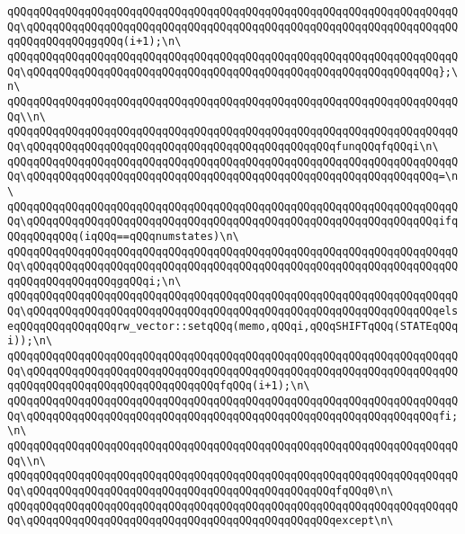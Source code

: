 \verb|qQQqqQQqqQQqqQQqqQQqqQQqqQQqqQQqqQQqqQQqqQQqqQQqqQQqqQQqqQQqqQQqqQQqqQQq\qQQqqQQqqQQqqQQqqQQqqQQqqQQqqQQqqQQqqQQqqQQqqQQqqQQqqQQqqQQqqQQqqQQqqQQqqQQqqQQqgqQQq(i+1);\n\|\newline
\verb|qQQqqQQqqQQqqQQqqQQqqQQqqQQqqQQqqQQqqQQqqQQqqQQqqQQqqQQqqQQqqQQqqQQqqQQq\qQQqqQQqqQQqqQQqqQQqqQQqqQQqqQQqqQQqqQQqqQQqqQQqqQQqqQQqqQQqqQQq};\n\|\newline
\verb|qQQqqQQqqQQqqQQqqQQqqQQqqQQqqQQqqQQqqQQqqQQqqQQqqQQqqQQqqQQqqQQqqQQqqQQq\\n\|\newline
\verb|qQQqqQQqqQQqqQQqqQQqqQQqqQQqqQQqqQQqqQQqqQQqqQQqqQQqqQQqqQQqqQQqqQQqqQQq\qQQqqQQqqQQqqQQqqQQqqQQqqQQqqQQqqQQqqQQqqQQqqQQqfunqQQqfqQQqi\n\|\newline
\verb|qQQqqQQqqQQqqQQqqQQqqQQqqQQqqQQqqQQqqQQqqQQqqQQqqQQqqQQqqQQqqQQqqQQqqQQq\qQQqqQQqqQQqqQQqqQQqqQQqqQQqqQQqqQQqqQQqqQQqqQQqqQQqqQQqqQQqqQQq=\n\|\newline
\verb|qQQqqQQqqQQqqQQqqQQqqQQqqQQqqQQqqQQqqQQqqQQqqQQqqQQqqQQqqQQqqQQqqQQqqQQq\qQQqqQQqqQQqqQQqqQQqqQQqqQQqqQQqqQQqqQQqqQQqqQQqqQQqqQQqqQQqqQQqifqQQqqQQqqQQq(iqQQq==qQQqnumstates)\n\|\newline
\verb|qQQqqQQqqQQqqQQqqQQqqQQqqQQqqQQqqQQqqQQqqQQqqQQqqQQqqQQqqQQqqQQqqQQqqQQq\qQQqqQQqqQQqqQQqqQQqqQQqqQQqqQQqqQQqqQQqqQQqqQQqqQQqqQQqqQQqqQQqqQQqqQQqqQQqqQQqqQQqgqQQqi;\n\|\newline
\verb|qQQqqQQqqQQqqQQqqQQqqQQqqQQqqQQqqQQqqQQqqQQqqQQqqQQqqQQqqQQqqQQqqQQqqQQq\qQQqqQQqqQQqqQQqqQQqqQQqqQQqqQQqqQQqqQQqqQQqqQQqqQQqqQQqqQQqqQQqelseqQQqqQQqqQQqqQQqrw_vector::setqQQq(memo,qQQqi,qQQqSHIFTqQQq(STATEqQQqi));\n\|\newline
\verb|qQQqqQQqqQQqqQQqqQQqqQQqqQQqqQQqqQQqqQQqqQQqqQQqqQQqqQQqqQQqqQQqqQQqqQQq\qQQqqQQqqQQqqQQqqQQqqQQqqQQqqQQqqQQqqQQqqQQqqQQqqQQqqQQqqQQqqQQqqQQqqQQqqQQqqQQqqQQqqQQqqQQqqQQqqQQqfqQQq(i+1);\n\|\newline
\verb|qQQqqQQqqQQqqQQqqQQqqQQqqQQqqQQqqQQqqQQqqQQqqQQqqQQqqQQqqQQqqQQqqQQqqQQq\qQQqqQQqqQQqqQQqqQQqqQQqqQQqqQQqqQQqqQQqqQQqqQQqqQQqqQQqqQQqqQQqfi;\n\|\newline
\verb|qQQqqQQqqQQqqQQqqQQqqQQqqQQqqQQqqQQqqQQqqQQqqQQqqQQqqQQqqQQqqQQqqQQqqQQq\\n\|\newline
\verb|qQQqqQQqqQQqqQQqqQQqqQQqqQQqqQQqqQQqqQQqqQQqqQQqqQQqqQQqqQQqqQQqqQQqqQQq\qQQqqQQqqQQqqQQqqQQqqQQqqQQqqQQqqQQqqQQqqQQqqQQqfqQQq0\n\|\newline
\verb|qQQqqQQqqQQqqQQqqQQqqQQqqQQqqQQqqQQqqQQqqQQqqQQqqQQqqQQqqQQqqQQqqQQqqQQq\qQQqqQQqqQQqqQQqqQQqqQQqqQQqqQQqqQQqqQQqqQQqqQQqexcept\n\|\newline
